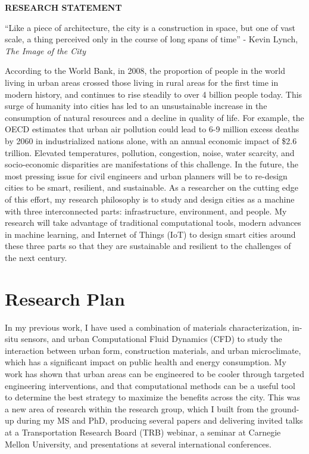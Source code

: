 \documentclass[12pt]{article}
\begin{document}
 \sloppy %

\begin{center}
{\large \uppercase{\textbf{Research Statement}}}
\end{center}

``Like a piece of architecture, the city is a construction in space, but one of vast scale, a thing perceived only in the course of long spans of time'' - Kevin Lynch, \textit{The Image of the City }

According to the World Bank, in 2008, the proportion of people in the world living in urban areas crossed those living in rural areas for the first time in modern history, and continues to rise steadily to over 4 billion people today. This surge of humanity into cities has led to an unsustainable increase in the consumption of natural resources and a decline in quality of life. For example, the OECD estimates that urban air pollution could lead to 6-9 million excess deaths by 2060 in industrialized nations alone, with an annual economic impact of \$2.6 trillion. Elevated temperatures, pollution, congestion, noise, water scarcity, and socio-economic disparities are manifestations of this challenge. In the future, the most pressing issue for civil engineers and urban planners will be to re-design cities to be smart, resilient, and sustainable. As a researcher on the cutting edge of this effort, my research philosophy is to study and design cities as a machine with three interconnected parts: infrastructure, environment, and people. My research will take advantage of traditional computational tools, modern advances in machine learning, and Internet of Things (IoT) to design smart cities around these three parts so that they are sustainable and resilient to the challenges of the next century.

\section*{Research Plan}
In my previous work, I have used a combination of materials characterization, in-situ sensors, and urban Computational Fluid Dynamics (CFD) to study the interaction between urban form, construction materials, and urban microclimate, which has a significant impact on public health and energy consumption. My work has shown that urban areas can be engineered to be cooler through targeted engineering interventions, and that computational methods can be a useful tool to determine the best strategy to maximize the benefits across the city. This was a new area of research within the research group, which I built from the ground-up during my MS and PhD, producing several papers and delivering invited talks at a Transportation Research Board (TRB) webinar, a seminar at Carnegie Mellon University, and presentations at several international conferences.
\end{document}
